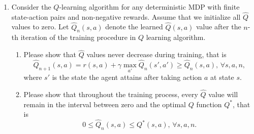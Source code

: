 \begin{exercise}

    \begin{enumerate}
        \item
            Consider the $Q$-learning algorithm for any deterministic MDP with finite state-action pairs and non-negative rewards. Assume that we initialize all $\hat{Q}$ values to zero. Let $\hat{Q}_n(s,a)$ denote the learned $\hat{Q}(s,a)$  value after the $n$-th iteration of the training procedure in $Q$ learning algorithm.
            \begin{enumerate}
                \item Please show that $\hat{Q}$ values never decrease during training, that is $$\hat{Q}_{n+1}(s,a)=r(s,a)+\gamma \max_{a'}\hat{Q}_n(s', a') \geq \hat{Q}_n(s, a), \,\forall s,a,n,$$
                    where $s'$ is the state the agent attains after taking action $a$ at state $s$.
                \item Please show that throughout the training process, every $\hat{Q}$ value will remain in the interval between zero and the optimal $Q$ function $Q^*$, that is
                    $$0\leq \hat{Q}_{n}(s,a) \leq Q^*(s,a),\, \forall s,a,n.$$
            \end{enumerate}


\end{enumerate}
\end{exercise}
